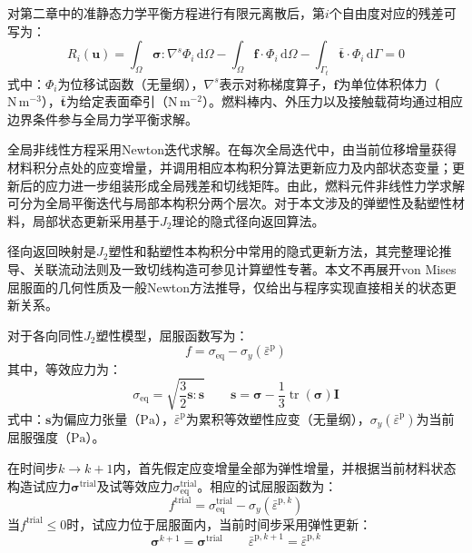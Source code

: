 对第二章中的准静态力学平衡方程进行有限元离散后，第$i$个自由度对应的残差可写为：
\begin{equation}
	R_i(\mathbf{u})
	=
	\int_{\Omega}
	\boldsymbol{\sigma}:\nabla^{s}\boldsymbol{\varPhi}_i
	\,\mathrm{d}\Omega
	-
	\int_{\Omega}
	\mathbf{f}\cdot\boldsymbol{\varPhi}_i
	\,\mathrm{d}\Omega
	-
	\int_{\Gamma_t}
	\bar{\mathbf{t}}\cdot\boldsymbol{\varPhi}_i
	\,\mathrm{d}\Gamma
	=0
	\label{eq:ch4_mechanical_residual}
\end{equation}
\noindent 式中：$\boldsymbol{\varPhi}_i$为位移试函数（无量纲），$\nabla^{s}$表示对称梯度算子，$\mathbf{f}$为单位体积体力（$\mathrm{N\,m^{-3}}$），$\bar{\mathbf{t}}$为给定表面牵引（$\mathrm{N\,m^{-2}}$）。燃料棒内、外压力以及接触载荷均通过相应边界条件参与全局力学平衡求解。

全局非线性方程采用Newton迭代求解。在每次全局迭代中，由当前位移增量获得材料积分点处的应变增量，并调用相应本构积分算法更新应力及内部状态变量；更新后的应力进一步组装形成全局残差和切线矩阵。由此，燃料元件非线性力学求解可分为全局平衡迭代与局部本构积分两个层次。对于本文涉及的弹塑性及黏塑性材料，局部状态更新采用基于$J_2$理论的隐式径向返回算法。


径向返回映射是$J_2$塑性和黏塑性本构积分中常用的隐式更新方法，其完整理论推导、关联流动法则及一致切线构造可参见计算塑性专著\cite{dunneIntroductionComputationalPlasticity2005}。本文不再展开von Mises屈服面的几何性质及一般Newton方法推导，仅给出与程序实现直接相关的状态更新关系。

对于各向同性$J_2$塑性模型，屈服函数写为：
\begin{equation}
	f
	=
	\sigma_{\mathrm{eq}}
	-
	\sigma_y\left(\bar{\varepsilon}^{\mathrm{p}}\right)
	\label{eq:ch4_j2_yield}
\end{equation}
其中，等效应力为：
\begin{equation}
	\sigma_{\mathrm{eq}}
	=
	\sqrt{\frac{3}{2}
		\boldsymbol{s}:\boldsymbol{s}}
	\qquad
	\boldsymbol{s}
	=
	\boldsymbol{\sigma}
	-\frac{1}{3}\operatorname{tr}
	(\boldsymbol{\sigma})\mathbf{I}
	\label{eq:ch4_equivalent_stress}
\end{equation}
\noindent 式中：$\boldsymbol{s}$为偏应力张量（$\mathrm{Pa}$），$\bar{\varepsilon}^{\mathrm{p}}$为累积等效塑性应变（无量纲），$\sigma_y\left(\bar{\varepsilon}^{\mathrm{p}}\right)$为当前屈服强度（$\mathrm{Pa}$）。

在时间步$k\rightarrow k+1$内，首先假定应变增量全部为弹性增量，并根据当前材料状态构造试应力$\boldsymbol{\sigma}^{\mathrm{trial}}$及试等效应力$\sigma_{\mathrm{eq}}^{\mathrm{trial}}$。相应的试屈服函数为：
\begin{equation}
	f^{\mathrm{trial}}
	=
	\sigma_{\mathrm{eq}}^{\mathrm{trial}}
	-
	\sigma_y\left(\bar{\varepsilon}^{\mathrm p,k}\right)
	\label{eq:ch4_trial_yield}
\end{equation}
当$f^{\mathrm{trial}}\leq 0$时，试应力位于屈服面内，当前时间步采用弹性更新：
\begin{equation}
	\boldsymbol{\sigma}^{k+1}
	=
	\boldsymbol{\sigma}^{\mathrm{trial}}
	\qquad
	\bar{\varepsilon}^{\mathrm p,k+1}
	=
	\bar{\varepsilon}^{\mathrm p,k}
	\label{eq:ch4_elastic_update}
\end{equation}

